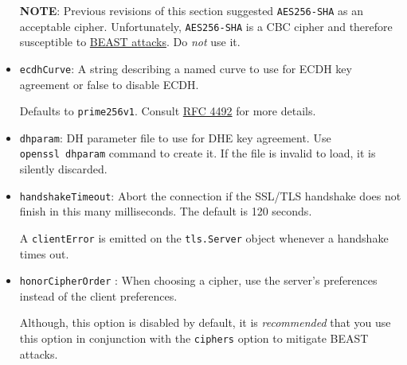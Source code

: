 \begin{itemize}
  \textbf{NOTE}: Previous revisions of this section suggested
  \texttt{AES256-SHA} as an acceptable cipher. Unfortunately,
  \texttt{AES256-SHA} is a CBC cipher and therefore susceptible to
  \href{http://blog.ivanristic.com/2011/10/mitigating-the-beast-attack-on-tls.html}{BEAST
  attacks}. Do \emph{not} use it.
\item
  \texttt{ecdhCurve}: A string describing a named curve to use for ECDH
  key agreement or false to disable ECDH.

  Defaults to \texttt{prime256v1}. Consult
  \href{http://www.rfc-editor.org/rfc/rfc4492.txt}{RFC 4492} for more
  details.
\item
  \texttt{dhparam}: DH parameter file to use for DHE key agreement. Use
  \texttt{openssl\ dhparam} command to create it. If the file is invalid
  to load, it is silently discarded.
\item
  \texttt{handshakeTimeout}: Abort the connection if the SSL/TLS
  handshake does not finish in this many milliseconds. The default is
  120 seconds.

  A \texttt{\textquotesingle{}clientError\textquotesingle{}} is emitted
  on the \texttt{tls.Server} object whenever a handshake times out.
\item
  \texttt{honorCipherOrder} : When choosing a cipher, use the server's
  preferences instead of the client preferences.

  Although, this option is disabled by default, it is \emph{recommended}
  that you use this option in conjunction with the \texttt{ciphers}
  option to mitigate BEAST attacks.


\end{itemize}
